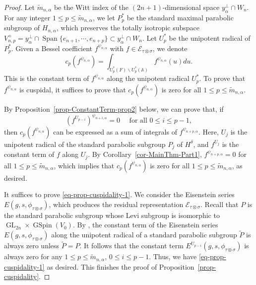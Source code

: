 \documentclass[12pt]{amsart}
\newcommand{\A}{\mathbb{A}}
\newcommand{\wt}{\widetilde}
\newcommand{\Span}{\operatorname{Span}}
\newcommand{\CE}{{\mathcal{E}}}
\theoremstyle{remark}
\DeclareMathOperator{\GL}{GL}
\DeclareMathOperator{\GSpin}{GSpin}
\begin{document}
\begin{proof}
Let $\wt m_{n,\alpha}$ be the Witt index of the $(2n+1)$-dimensional space $y_{\alpha}^\perp\cap W_{n}$. For any integer $1\le p \le \wt m_{n,\alpha}$, we let $P_p^*$ be the standard maximal parabolic subgroup of $H_{n,\alpha}$, which preserves the totally isotropic subspace  $V_{n,p}^+=y_{\alpha}^\perp \cap \Span\{e_{n+1}, \cdots, e_{n+p}\}\subset y_{\alpha}^\perp\cap W_{n}$. Let $U_p^*$ be the unipotent radical of $P_p^*$. Given a Bessel coefficient $f^{\psi_{n,\alpha}}$ with $f\in \CE_{\tau\otimes\sigma}$, we denote
\begin{equation}
\label{eq-prop-cuspidality-c_p}
c_p(f^{\psi_{n,\alpha}})=\int_{U_p^*(F)\backslash U_p^*(\A)} f^{\psi_{n,\alpha}} (u)du.	
\end{equation}
This is the constant term of $f^{\psi_{n,\alpha}}$ along the unipotent radical $U_p^*$. To prove that $f^{\psi_{n,\alpha}}$ is cuspidal, it suffices to prove that $c_p(f^{\psi_{n,\alpha}})$ is zero for all $1\le p \le \wt m_{n,\alpha}$.

By Proposition~\ref{prop-ConstantTerm-prop2} below, we can prove that, if
\begin{equation}
\label{eq-prop-cuspidality-1}
( f^{U_{p-i}} )^{\psi_{n+i,\alpha}} = 0 \quad \text{ for all }0\le i \le p-1,	
\end{equation}
then $c_p(f^{\psi_{n,\alpha}})$ can be expressed as a sum of integrals of $f^{\psi_{n+p,\alpha}}$.
Here, $U_j$ is the unipotent radical of the standard parabolic subgroup $P_j$ of $H^\delta$, and $f^{U_j}$ is the constant term of $f$ along $U_j$. 
By Corollary~\ref{cor-MainThm-Part1}, $f^{\psi_{n+p,\alpha}}=0$ for all $1\le p \le \wt m_{n,\alpha}$, which implies that $c_p(f^{\psi_{n,\alpha}})$ is zero for all $1\le p \le \wt m_{n,\alpha}$, as desired.

It suffices to prove \eqref{eq-prop-cuspidality-1}. We consider the Eisenstein series $E(g,s,\phi_{\tau\otimes\sigma})$, which produces the residual representation $\CE_{\tau\otimes\sigma}$. Recall that $P$ is the standard parabolic subgroup whose Levi subgroup is isomorphic to $\GL_{2n}\times \GSpin(V_0)$.  By \cite[II.1.7]{MoglinWaldspurger1995}, the constant term of the Eisenstein series $E(g,s,\phi_{\tau\otimes\sigma})$ along the unipotent radical of a standard parabolic subgroup $\wt P$ is always zero unless $\wt P=P$. It follows that the constant term $E^{U_{p-i}}(g,s,\phi_{\tau\otimes\sigma})$ is always zero for any $1\le p \le \wt m_{n,\alpha}$, $0\le i \le p-1$. Thus, we have \eqref{eq-prop-cuspidality-1} as desired. This finishes the proof of Proposition~\ref{prop-cuspidality}. 
\end{proof}
\end{document}
